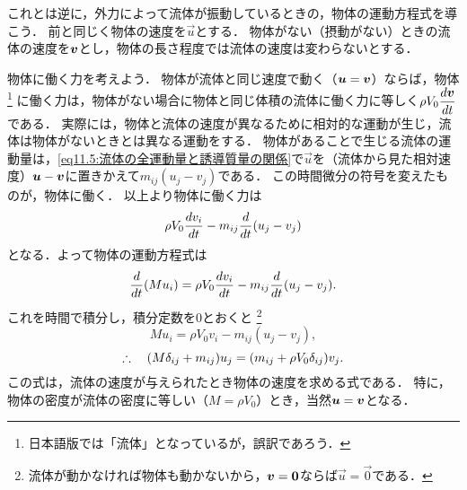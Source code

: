 これとは逆に，外力によって流体が振動しているときの，物体の運動方程式を導こう．
前と同じく物体の速度を$\vec{u}$とする．
物体がない（摂動がない）ときの流体の速度を$\vb*{v}$とし，物体の長さ程度では流体の速度は変わらないとする．

物体に働く力を考えよう．
物体が流体と同じ速度で動く（$\vb*{u}=\vb*{v}$）ならば，物体\footnote{日本語版では「流体」となっているが，誤訳であろう．}
に働く力は，物体がない場合に物体と同じ体積の流体に働く力に等しく$\rho V_0 \ddv{\v}{t}$である．
実際には，物体と流体の速度が異なるために相対的な運動が生じ，流体は物体がないときとは異なる運動をする．
物体があることで生じる流体の運動量は，\eqref{eq11.5:流体の全運動量と誘導質量の関係}で$\vec{u}$を（流体から見た相対速度）$\vb*{u}-\vb*{v}$に置きかえて$m_{ij}(u_j-v_j)$である．
この時間微分の符号を変えたものが，物体に働く．
以上より物体に働く力は
\[
    \rho V_0 \dv{v_i}{t} -m_{ij} \dv{t}(u_j-v_j)
\]
となる．よって物体の運動方程式は
\[
    \dv{t} (Mu_i) = \rho V_0 \dv{v_i}{t} -m_{ij} \dv{t}(u_j-v_j) .
\]
これを時間で積分し，積分定数を0とおくと
\footnote{流体が動かなければ物体も動かないから，$\vb*{v}=\vb*{0}$ならば$\vec{u}=\vec{0}$である．}
\[
    Mu_i = \rho V_0 v_i -m_{ij} (u_j-v_j) ,
\]
\begin{equation}\label{eq11.9:流体の速度が与えられたとき物体の速度を求める式}
    \therefore\quad (M\delta_{ij}+m_{ij})u_j = (m_{ij}+\rho V_0\delta_{ij})v_j .
\end{equation}
この式は，流体の速度が与えられたとき物体の速度を求める式である．
特に，物体の密度が流体の密度に等しい（$M=\rho V_0$）とき，当然$\vb*{u}=\vb*{v}$となる．




    


